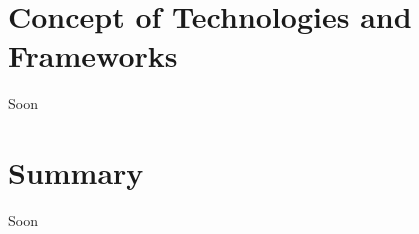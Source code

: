 \vspace{-0.3cm}


\section{Concept of Technologies and Frameworks}\label{sec:4.3}
\vspace{-0.5cm}
\noindent Soon
 
\vspace{-0.3cm}


\section{Summary}\label{sec:4.4}
\vspace{-0.5cm}
\noindent Soon

\vspace{-0.3cm}



